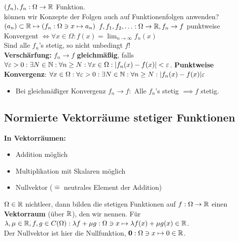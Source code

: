 $ (f_n), f_n : \Omega \to \mathbb{R}  $ Funktion.\\
können wir Konzepte der Folgen auch auf Funktionenfolgen anwenden?\\
$ (a_n) \subset \mathbb{R} \mapsto (f_n : \Omega \ni x \mapsto a_n) $
$ f, f_1, f_2, \dotsc : \Omega \to \mathbb{R} , f_n \to  f  $ punktweise Konvergent $ \iff \forall x \in \Omega : f(x) = \lim_{n \to \infty} f_n(x) $\\
Sind alle $ f_n $'s stetig, so nicht unbedingt $ f $!\\
\textbf{Verschärfung:} $ f_n \to f $ \textbf{gleichmäßig}, falls $ \forall \varepsilon > 0 : \exists N \in \mathbb{N} : \forall n \geq N : \forall x \in \Omega : | f_n(x) - f(x) | < \varepsilon  $.
\begingroup
\color{green}
\textbf{Punktweise Konvergenz}:
$ \forall x \in \Omega : \forall \varepsilon > 0 : \exists N \in \mathbb{N}  : \forall n \geq N : | f_n(x) - f(x) | \varepsilon  $ 
\endgroup

\begin{itemize}
	\item Bei gleichmäßiger Konvergenz $ f_n \to f: $ Alle $ f_n $'s stetig $ \implies f $ stetig.
\end{itemize}

\subsection{Normierte Vektorräume stetiger Funktionen}
\textbf{In Vektorräumen:}
\begin{itemize}
	\item Addition möglich
	\item Multiplikation mit Skalaren möglich
	\item Nullvektor ($ \hat{=} $ neutrales Element der Addition)
\end{itemize}
$ \Omega \in \mathbb{R}  $ nichtleer, dann bilden die stetigen Funktionen auf $ f: \Omega \to \mathbb{R}  $ einen \textbf{Vektorraum} (über $ \mathbb{R}  $), den wir  nennen. Für $ \lambda, \mu \in \mathbb{R} , f,g \in C(\Omega): \lambda f + \mu g : \Omega \ni x \mapsto \lambda f(x) + \mu g(x) \in \mathbb{R}  $.\\
Der Nullvektor ist hier die Nullfunktion, $ \mathbf{0} : \Omega \ni x \mapsto 0 \in \mathbb{R}  $.


